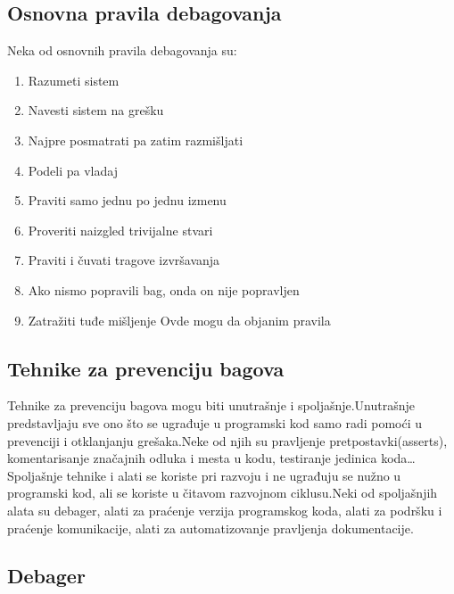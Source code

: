 \documentclass[a4paper]{article}
\begin{document}
\subsection{Osnovna pravila debagovanja}
\label{subsec:podnaslovN}

Neka od osnovnih pravila debagovanja su:
\begin{enumerate}
	\item Razumeti sistem
	\item Navesti sistem na grešku
	\item Najpre posmatrati pa zatim razmišljati
	\item Podeli pa vladaj
	\item Praviti samo jednu po jednu izmenu
	\item Proveriti naizgled trivijalne stvari
	\item Praviti i čuvati tragove izvršavanja
	\item Ako nismo popravili bag, onda on nije popravljen
	\item Zatražiti tuđe mišljenje
	Ovde mogu da objanim pravila
\end{enumerate}

\subsection{Tehnike za prevenciju bagova}
\label{subsec:Tehnike za prevenciju bagova}

Tehnike za prevenciju bagova mogu biti unutrašnje i spoljašnje.Unutrašnje predstavljaju sve ono što se ugrađuje u programski kod samo radi pomoći u prevenciji i otklanjanju grešaka.Neke od njih su pravljenje pretpostavki(asserts), komentarisanje značajnih odluka i mesta u kodu, testiranje jedinica koda…Spoljašnje tehnike i alati se koriste pri razvoju i ne ugrađuju se nužno u programski kod, ali se koriste u čitavom razvojnom ciklusu.Neki od spoljašnjih alata su debager, alati za praćenje verzija programskog koda, alati za podršku i praćenje komunikacije, alati za automatizovanje pravljenja dokumentacije.

\subsection{Debager}
\label{subsec:Debager}
\end{document}

